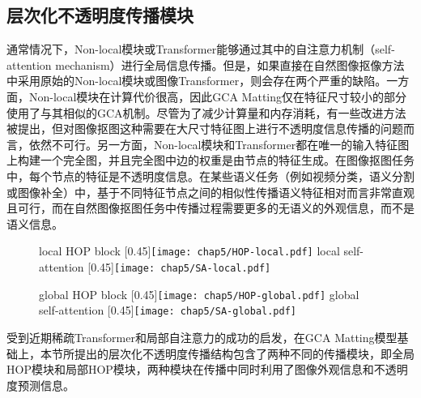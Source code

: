 \subsection{层次化不透明度传播模块}
通常情况下，Non-local模块\cite{wang2018non}或Transformer\cite{vaswani2017attention}能够通过其中的自注意力机制（self-attention mechanism）\cite{lin2017structured}进行全局信息传播。但是，如果直接在自然图像抠像方法中采用原始的Non-local模块或图像Transformer，则会存在两个严重的缺陷。一方面，Non-local模块在计算代价很高，因此GCA Matting仅在特征尺寸较小的部分使用了与其相似的GCA机制。尽管为了减少计算量和内存消耗，有一些改进方法被提出\cite{zhu2019asymmetric}，但对图像抠图这种需要在大尺寸特征图上进行不透明度信息传播的问题而言，依然不可行。另一方面，Non-local模块和Transformer都在唯一的输入特征图上构建一个完全图，并且完全图中边的权重是由节点的特征生成。在图像抠图任务中，每个节点的特征是不透明度信息。在某些语义任务（例如视频分类\cite{wang2018non}，语义分割\cite{zhu2019asymmetric}或图像补全\cite{yu2018generative}）中，基于不同特征节点之间的相似性传播语义特征相对而言非常直观且可行，而在自然图像抠图任务中传播过程需要更多的无语义的外观信息，而不是语义信息。


\begin{figure}[t]
	\centering
					{local HOP block}
					[0.45\textwidth]{\texttt{[image: chap5/HOP-local.pdf]}}
					{local self-attention}
					[0.45\textwidth]{\texttt{[image: chap5/SA-local.pdf]}}  
					                
	\centering
					{global HOP block}
					[0.45\textwidth]{\texttt{[image: chap5/HOP-global.pdf]}}
					{global self-attention}
					[0.45\textwidth]{\texttt{[image: chap5/SA-global.pdf]}}
	\label{fig5:block}
\end{figure}

受到近期稀疏Transformer\cite{child2019generating,huang2019interlaced}和局部自注意力\cite{ramachandran2019stand}的成功的启发，在GCA Matting模型基础上，本节所提出的层次化不透明度传播结构包含了两种不同的传播模块，即全局HOP模块和局部HOP模块，两种模块在传播中同时利用了图像外观信息和不透明度预测信息。

